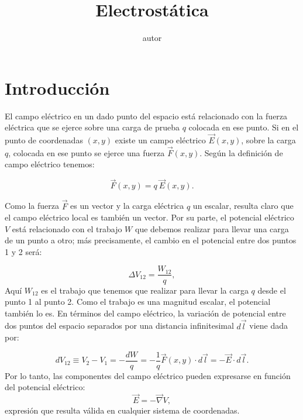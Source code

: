 \documentclass[epj]{svjour}
\def \practica {Electrost\'atica}
\begin{document}
 
\title{\practica}    
\author{autor}

\maketitle

\section{Introducci\'on}

El campo el\'ectrico en un dado punto del espacio est\'a relacionado con la fuerza
el\'ectrica que se ejerce sobre una carga de prueba $q$ colocada en ese punto. Si
en el punto de coordenadas $(x,y)$ existe un campo el\'ectrico $\vec{E}(x,y)$,
sobre la carga $q$, colocada en ese punto se ejerce una fuerza $\vec{F}(x,y)$.
Seg\'un la definici\'on de campo el\'ectrico tenemos:

\begin{equation} 
\vec{F}(x,y) = q \: \vec{E}(x,y).  
\end{equation}

Como la fuerza $\vec{F}$ es un vector y la carga el\'ectrica $q$ un escalar, resulta claro que el campo el\'ectrico local  es tambi\'en
un vector. Por su parte, el potencial el\'ectrico $V$ est\'a relacionado con el
trabajo $W$ que debemos realizar para llevar una carga de un punto a otro; m\'as
precisamente, el cambio en el potencial entre dos puntos 1 y 2 ser\'a: 

\begin{equation}
    \Delta V_{12} = \frac{W_{12}}{q},
\end{equation}
Aqu\'i $W_{12}$ es el trabajo que tenemos que realizar para llevar la
carga $q$ desde el punto 1 al punto 2. Como el trabajo es una magnitud escalar, el
potencial tambi\'en lo es. En t\'erminos del campo el\'ectrico, la variaci\'on de potencial entre dos puntos del espacio separados por una distancia infinitesimal $d\vec{l}$ viene dada por:

\begin{equation}
    dV_{12} \equiv V_2 - V_1 = - \frac{dW}{q} = - \frac{1}{q} \vec{F}(x,y)
    \cdot d\vec{l} = - \vec{E} \cdot d\vec{l}.
\end{equation}
Por lo tanto, las componentes del campo el\'ectrico pueden expresarse en funci\'on del potencial el\'ectrico:
\begin{equation}
    \vec{E} = - \vec{\nabla} V,
\end{equation}
expresi\'on que resulta v\'alida en cualquier sistema de coordenadas. 
\end{document}
